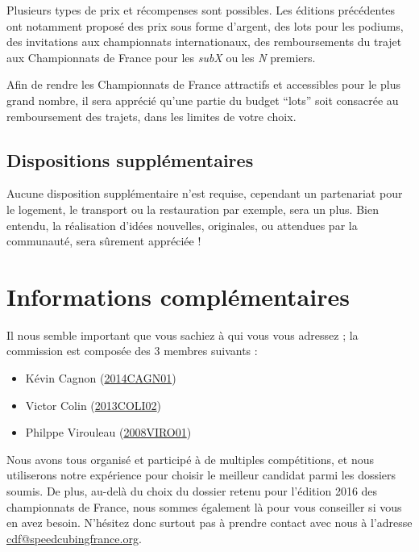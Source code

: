 \documentclass[a4paper,12pt]{scrartcl}
\begin{document}
Plusieurs types de prix et récompenses sont possibles. Les éditions précédentes ont
notamment proposé des prix sous forme d’argent, des lots pour les podiums,
des invitations aux championnats internationaux, des remboursements du trajet aux
Championnats de France pour les \emph{subX} ou les \emph{N} premiers.

Afin de rendre les Championnats de France attractifs et accessibles pour le plus
grand nombre, il sera apprécié qu’une partie du budget “lots” soit consacrée au
remboursement des trajets, dans les limites de votre choix.


\subsection*{Dispositions supplémentaires}


Aucune disposition supplémentaire n’est requise, cependant un partenariat pour le
logement, le transport ou la restauration par exemple, sera un plus.
Bien entendu, la réalisation d’idées nouvelles, originales, ou attendues par la
communauté, sera sûrement appréciée !

\section*{Informations complémentaires}

Il nous semble important que vous sachiez à qui vous vous adressez ; la commission
est composée des 3 membres suivants :

\begin{itemize}
    \item Kévin Cagnon (\href{https://www.worldcubeassociation.org/results/p.php?i=2014CAGN01}{2014CAGN01})
    \item Victor Colin (\href{https://www.worldcubeassociation.org/results/p.php?i=2013COLI02}{2013COLI02})
    \item Philppe Virouleau (\href{https://www.worldcubeassociation.org/results/p.php?i=2008VIRO01}{2008VIRO01})
\end{itemize}

Nous avons tous organisé et participé à de multiples compétitions, et nous utiliserons notre
expérience pour choisir le meilleur candidat parmi les dossiers soumis. De plus,
au-delà du choix du dossier retenu pour l'édition 2016 des championnats de France,
nous sommes également là pour vous conseiller si vous en avez besoin. N'hésitez
donc surtout pas à prendre contact avec nous à l'adresse
\href{mailto:cdf@speedcubingfrance.org}{cdf@speedcubingfrance.org}.





\end{document}
